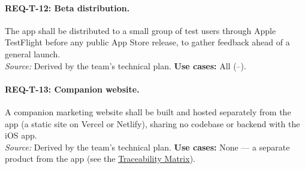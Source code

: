 \paragraph{REQ-T-12: Beta distribution.}
 The app shall be distributed to a small group of test users through Apple TestFlight before any public App Store release, to gather feedback ahead of a general launch.\\
\textit{Source:} Derived by the team's technical plan. \textbf{Use cases:} All (--).

\paragraph{REQ-T-13: Companion website.}
 A companion marketing website shall be built and hosted separately from the app (a static site on Vercel or Netlify), sharing no codebase or backend with the iOS app.\\
\textit{Source:} Derived by the team's technical plan. \textbf{Use cases:} None --- a separate product from the app (see the \hyperref[Chapter:Traceability]{Traceability Matrix}).
